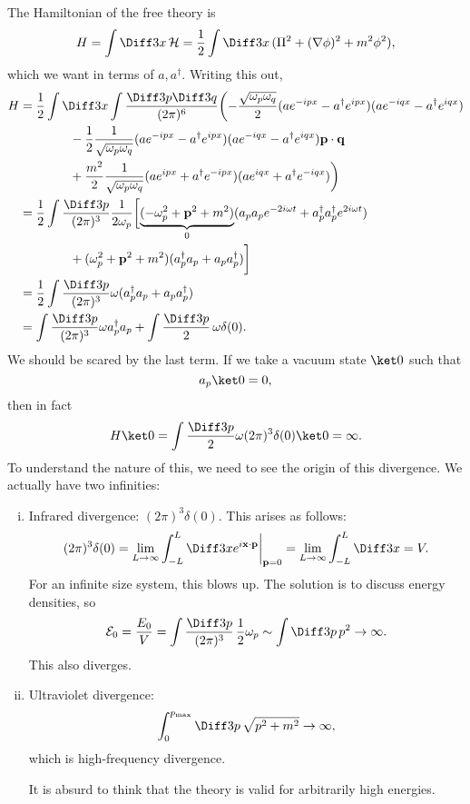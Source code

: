 \documentclass[12pt]{article}
\begin{document}
The Hamiltonian of the free theory is
\[
	H = \int \Diff3 x \, \mathcal{H} = \frac{1}{2} \int \Diff 3 x\,(\Pi^2 + (\nabla \phi)^2 + m^2 \phi^2),
\]
which we want in terms of $a, a^\dagger$. Writing this out,
\begin{align*}
	H &= \frac{1}{2} \int \Diff 3 x \int \frac{\Diff 3 p \Diff 3 q}{(2\pi)^6} \biggl( - \frac{\sqrt{\omega_p \omega_q}}{2} (a e^{-ipx} - a^{\dagger} e^{ipx})(ae^{-iqx} - a^{\dagger} e^{iqx}) \\
	  & \qquad \qquad - \frac{1}{2} \frac{1}{\sqrt{\omega_p \omega_q}} (a e^{-ipx} - a^{\dagger} e^{ipx})(a e^{-iqx} - a^\dagger e^{iqx}) \mathbf{p} \cdot \mathbf{q} \\
	  & \qquad \qquad + \frac{m^2}{2} \frac{1}{\sqrt{\omega_p \omega_q}} (a e^{ipx} + a^{\dagger} e^{-ipx})(ae^{iqx} + a^{\dagger} e^{-iqx}) \biggr) \\
	  &= \frac{1}{2} \int \frac{\Diff 3 p}{(2 \pi)^3} \frac{1}{2 \omega_p} \biggl[ \underbrace{(-\omega_p^2 + \mathbf{p}^2 + m^2)}_{0}(a_p a_p e^{-2i\omega t} + a_p^{\dagger} a_p^{\dagger} e^{2i\omega t}) \\
	  & \qquad \qquad + (\omega_p^2 + \mathbf{p}^2 + m^2)(a_p^\dagger a_p + a_p a_p^\dagger) \biggr] \\
	  &= \frac{1}{2} \int \frac{\Diff 3p}{(2 \pi)^3} \omega(a_p^\dagger a_p + a_p a_p^\dagger) \\
	  &= \int \frac{\Diff 3 p}{(2 \pi)^3} \omega a_p^\dagger a_p + \int \frac{\Diff 3 p}{2} \, \omega \delta(0).
\end{align*}
We should be scared by the last term. If we take a vacuum state $\ket 0$ such that
\[
a_p \ket 0 = 0,
\]
then in fact
\[
H \ket 0 = \int \frac{\Diff 3 p}{2} \omega (2 \pi)^3 \delta(0) \ket 0 = \infty.
\]
To understand the nature of this, we need to see the origin of this divergence. We actually have two infinities:
\begin{enumerate}[(i)]
	\item Infrared divergence: $(2 \pi)^3 \delta(0)$. This arises as follows:
		\[
			(2\pi)^3 \delta(0) = \lim_{L \to \infty} \int_{-L}^L \Diff 3 x e^{i \mathbf{x} \cdot \mathbf{p}} \biggr|_{\mathbf{p} = 0} = \lim_{L \to \infty} \int_{-L}^{L} \Diff 3 x = V.
		\]
		For an infinite size system, this blows up. The solution is to discuss energy densities, so
		\[
		\mathcal{E}_0 = \frac{E_0}{V} = \int \frac{\Diff 3p}{(2 \pi)^3} \, \frac{1}{2} \omega_p \sim \int \Diff 3 p \, p^{2} \to \infty.
		\]
		This also diverges.
	\item Ultraviolet divergence:
		\[
			\int_0^{p_{\mathrm{max}}} \Diff 3 p \, \sqrt{p^2 + m^2} \to \infty,
		\]
		which is high-frequency divergence.

		It is absurd to think that the theory is valid for arbitrarily high energies.
\end{enumerate}
\end{document}
